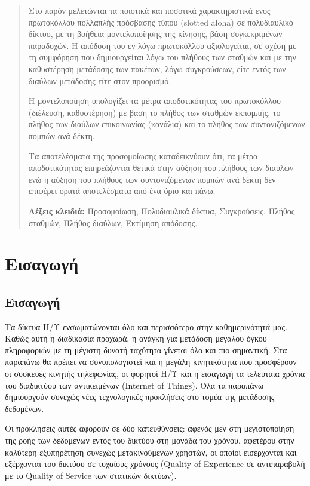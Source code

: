 \documentclass[12pt]{report}
\begin{document}
\begin{abstract}
Στο παρόν μελετώνται τα ποιοτικά και ποσοτικά χαρακτηριστικά ενός πρωτοκόλλου πολλαπλής πρόσβασης τύπου (\textlatin{slotted aloha}) σε πολυδιαυλικό δίκτυο, με τη βοήθεια μοντελοποίησης της κίνησης, βάση συγκεκριμένων παραδοχών. Η απόδοση του εν λόγω πρωτοκόλλου αξιολογείται, σε σχέση με τη συμφόρηση που δημιουργείται λόγω του πλήθους των σταθμών και με την καθυστέρηση μετάδοσης των πακέτων, λόγω συγκρούσεων, είτε εντός των διαύλων μετάδοσης είτε στον προορισμό.

Η μοντελοποίηση υπολογίζει τα μέτρα αποδοτικότητας του πρωτοκόλλου (διέλευση, καθυστέρηση) με βάση το πλήθος των σταθμών εκπομπής, το πλήθος των διαύλων επικοινωνίας (κανάλια) και το πλήθος των συντονιζόμενων πομπών ανά δέκτη.

Τα αποτελέσματα της προσομοίωσης καταδεικνύουν ότι, τα μέτρα αποδοτικότητας επηρεάζονται θετικά στην αύξηση του πλήθους των διαύλων ενώ η αύξηση του πλήθους των συντονιζόμενων πομπών ανά δέκτη δεν επιφέρει ορατά αποτελέσματα από ένα όριο και πάνω.

\vspace{10mm}

\noindent \textbf{Λέξεις κλειδιά:} Προσομοίωση, Πολυδιαυλικά δίκτυα, Συγκρούσεις, Πλήθος σταθμών, Πλήθος διαύλων, Εκτίμηση απόδοσης.
\end{abstract}

\hypersetup{pageanchor=true}
\clearpage
{}

\chapter{Εισαγωγή}\label{ch1}
\section{Εισαγωγή}
Τα δίκτυα Η/Υ ενσωματώνονται όλο και περισσότερο στην καθημερινότητά μας. Καθώς αυτή η διαδικασία προχωρά, η ανάγκη για μετάδοση μεγάλου όγκου πληροφοριών με τη μέγιστη δυνατή ταχύτητα γίνεται όλο και πιο σημαντική. Στα παραπάνω θα πρέπει να συνυπολογιστεί και η μεγάλη κινητικότητα που προσφέρουν οι συσκευές κινητής τηλεφωνίας, οι φορητοί Η/Υ και η εισαγωγή τα τελευταία χρόνια του διαδικτύου των αντικειμένων (\textlatin{Internet of Things}). Όλα τα παραπάνω δημιουργούν συνεχώς νέες τεχνολογικές προκλήσεις στο τομέα της μετάδοσης δεδομένων.

Οι προκλήσεις αυτές αφορούν σε δύο κατευθύνσεις: αφενός μεν στη μεγιστοποίηση της ροής των δεδομένων εντός του δικτύου στη μονάδα του χρόνου, αφετέρου στην καλύτερη εξυπηρέτηση συνεχώς μετακινούμενων χρηστών, οι οποίοι εισέρχονται και εξέρχονται του δικτύου σε τυχαίους χρόνους (\textlatin{Quality of Experience} σε αντιπαραβολή με το \textlatin{Quality of Service} των στατικών δικτύων).
\end{document}
